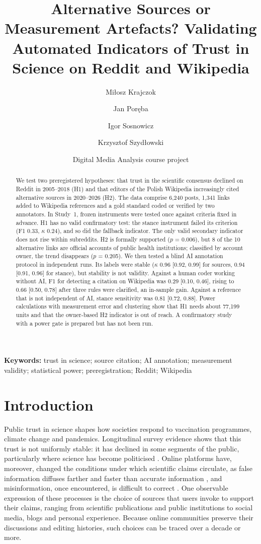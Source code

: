 \documentclass[10pt,a4paper]{article}
\title{Alternative Sources or Measurement Artefacts? Validating Automated Indicators of Trust in Science on Reddit and Wikipedia}
\author{Miłosz Krajczok \and Jan Poręba \and Igor Sosnowicz \and Krzysztof Szydłowski}
\date{Digital Media Analysis course project}
\begin{document}
\maketitle

\begin{abstract}
We test two preregistered hypotheses: that trust in the scientific consensus declined on
Reddit in 2005--2018 (H1) and that editors of the Polish Wikipedia increasingly cited
alternative sources in 2020--2026 (H2). The data comprise 6,240 posts,
1,341 links added to Wikipedia references and a gold standard coded or verified by
two annotators. In Study~1, frozen instruments were tested once against criteria fixed in
advance. H1 has no valid confirmatory test: the stance instrument failed its criterion (F1
0.33, $\kappa$ 0.24), and so did the fallback indicator. The
only valid secondary indicator does not rise within subreddits. H2 is formally supported
($p$ = 0.006), but 8 of the 10 alternative
links are official accounts of public health institutions; classified by account owner, the
trend disappears ($p$ = 0.205). We then tested a blind AI annotation protocol in
independent runs. Its labels were stable ($\kappa$ 0.96 [0.92, 0.99] for sources,
0.94 [0.91, 0.96] for stance), but stability is not validity. Against a human coder working
without AI, F1 for detecting a citation on Wikipedia was 0.29 [0.10, 0.46], rising to
0.66 [0.50, 0.78] after three rules were clarified, an in-sample gain. Against a
reference that is not independent of AI, stance sensitivity was
0.81 [0.72, 0.88]. Power calculations with measurement error and clustering show
that H1 needs about 77,199 units and that the owner-based H2 indicator
is out of reach. A confirmatory study with a power gate is prepared but has not been run.
\end{abstract}

\noindent\textbf{Keywords:} trust in science; source citation; AI annotation; measurement validity;
statistical power; preregistration; Reddit; Wikipedia

\section{Introduction}
\label{sec:introduction}

Public trust in science shapes how societies respond to vaccination programmes, climate
change and pandemics. Longitudinal survey evidence shows that this trust is not uniformly
stable: it has declined in some segments of the public, particularly where science has
become politicised \cite{gauchat2012}. Online platforms have, moreover, changed the
conditions under which scientific claims circulate, as false information diffuses farther
and faster than accurate information \cite{vosoughi2018}, and misinformation, once
encountered, is difficult to correct \cite{lewandowsky2012}. One observable expression of
these processes is the choice of sources that users invoke to support their claims,
ranging from scientific publications and public institutions to social media, blogs and
personal experience. Because online communities preserve their discussions and editing
histories, such choices can be traced over a decade or more.
\end{document}
